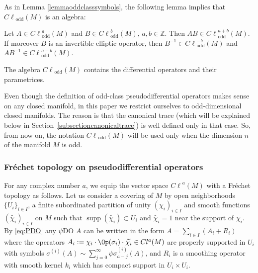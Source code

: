\documentclass[pdftex]{sigma}
\DeclareMathOperator{\odd}{odd} \DeclareMathOperator{\supp}{supp}
\newcommand{\Z}{{\mathbb Z}}
\def \Cl {{C\ell}}
\begin{document}
As in Lemma \ref{lemmaoddclasssymbols}, the following lemma implies that $\Cl_{\odd}(M)$ is an algebra:
\begin{lemma}\label{lema:oddClassproduct}
Let $A\in \Cl^{a}_{\odd}(M)$ and $B\in \Cl^{b}_{\odd}(M)$, $a,b\in\Z$. Then $AB\in \Cl^{a+b}_{\odd}(M)$. If moreover $B$ is an invertible elliptic operator, then $B^{-1}\in \Cl^{-b}_{\odd}(M)$ and $AB^{-1}\in \Cl^{a-b}_{\odd}(M)$.
\end{lemma}

The algebra $\Cl_{\odd}(M)$ contains the dif\/ferential operators and their parametrices.

\begin{remark}\label{remarknotationClodd}
Even though the def\/inition of odd-class pseudodif\/ferential operators makes sense on any closed manifold, in this paper we restrict ourselves to odd-dimensional closed manifolds. The reason is that the canonical trace (which will be explained below in Section~\ref{subsectioncanonicaltrace}) is well def\/ined only in that case. So, from now on, the notation $\Cl_{\odd}(M)$ will be used only when the dimension $n$ of the manifold $M$ is odd.
\end{remark}

\subsubsection{Fr\'echet topology on pseudodif\/ferential operators}\label{subsectionfrechettop}

For any complex number $a$,  we equip the vector space $\Cl^a(M)$ with a Fr\'echet topology as follows. Let us consider a covering of $M$ by open neighborhoods $\{U_i\}_{i\in I}$, a f\/inite subordinated partition of unity $(\chi_i)_{i\in I}$ and smooth functions $(\widetilde{\chi_i})_{i\in I}$ on $M$ such that $\supp(\widetilde{\chi_i})\subset U_i$ and $\widetilde{\chi_i}=1$ near the support of $\chi_i$. By \eqref{eq:PDO} any $\psi$DO $A$ can be written in the form $A=\sum\limits_{i\in I}(A_i+R_i)$ where the operators $A_i:=\chi_i\cdot\Op(\sigma_i)\cdot\widetilde{\chi_i}\in Cl^{a}(M)$ are properly supported in $U_i$ with symbols $\sigma^{(i)}(A)\sim\sum\limits_{j=0}^\infty\psi \sigma_{a-j}^{(i)}(A)$, and $R_i$ is a smoothing operator with smooth kernel $k_i$ which has compact support in $U_i\times U_i$.
\end{document}
